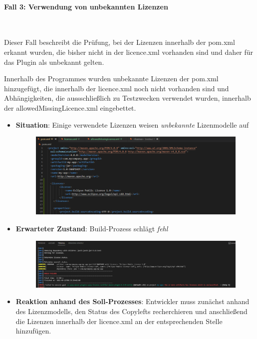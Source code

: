 \paragraph{Fall 3: Verwendung von unbekannten Lizenzen} $~$

Dieser Fall beschreibt die Prüfung, bei der Lizenzen innerhalb der pom.xml erkannt wurden, die bisher nicht in der licence.xml vorhanden sind und daher für das Plugin als unbekannt gelten. 

Innerhalb des Programmes wurden unbekannte Lizenzen der pom.xml hinzugefügt, die innerhalb der licence.xml noch nicht vorhanden sind und Abhängigkeiten, die aussschließlich zu Testzwecken verwendet wurden, innerhalb der allowedMissingLicence.xml eingebettet. 

\begin{itemize}
    \item \textbf{Situation}: Einige verwendete Lizenzen weisen \textit{unbekannte} Lizenmodelle auf
    
    \begin{figure}[h]
        \centering
        \includegraphics[scale=0.5]{Bilder/Fall3Situation.png}
    \end{figure}

    \item \textbf{Erwarteter Zustand}: Build-Prozess schlägt \textit{fehl} 
    
    \begin{figure}[h]
        \centering
        \includegraphics[scale=0.4]{Bilder/Fall3Zustand.png}
    \end{figure}

    \item \textbf{Reaktion anhand des Soll-Prozesses}: Entwickler muss zunächst anhand des Lizenzmodells, den Status des Copylefts recherchieren und anschließend die Lizenzen innerhalb der licence.xml an der entsprechenden Stelle hinzufügen. 
\end{itemize}

